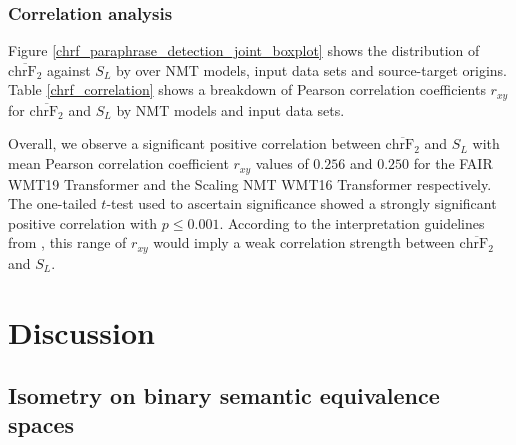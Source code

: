\documentclass[11pt,a4paper]{article}
\begin{document}
\subsubsection{Correlation analysis}

Figure \ref{chrf_paraphrase_detection_joint_boxplot} shows the distribution of $\overline{\text{chrF}_2}$ against $S_L$ by over NMT models, input data sets and source-target origins. Table \ref{chrf_correlation} shows a breakdown of Pearson correlation coefficients $r_{xy}$ for $\overline{\text{chrF}_2}$ and $S_L$ by NMT models and input data sets.

Overall, we observe a significant positive correlation between $\overline{\text{chrF}_2}$ and $S_L$ with mean Pearson correlation coefficient $r_{xy}$ values of $0.256$ and $0.250$ for the FAIR WMT19 Transformer and the Scaling NMT WMT16 Transformer respectively. The one-tailed $t$-test used to ascertain significance showed a strongly significant positive correlation with $p\leq0.001$. According to the interpretation guidelines from \citet{schober2018correlation}, this range of $r_{xy}$ would imply a weak correlation strength between $\overline{\text{chrF}_2}$ and $S_L$. 

\section{Discussion}

\subsection{Isometry on binary semantic equivalence spaces}
\end{document}
